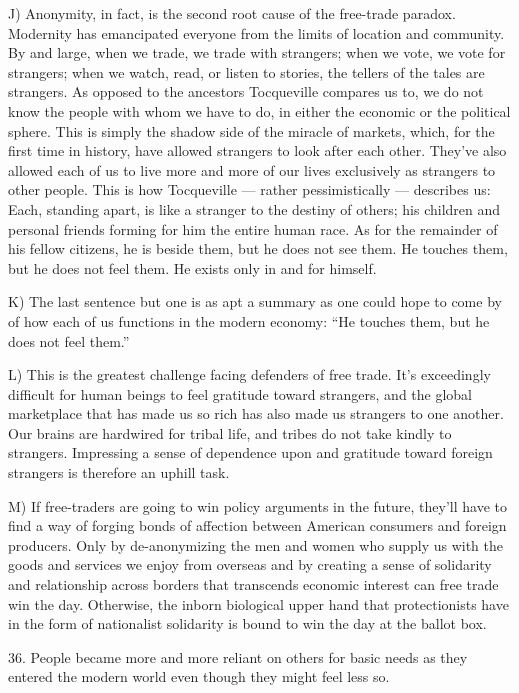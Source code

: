 \documentclass[UTF8,11pt]{ctexart}
\begin{document}
J) Anonymity, in fact, is the second root cause of the free-trade paradox. Modernity has emancipated everyone from the limits of location and community. By and large, when we trade, we trade with strangers; when we vote, we vote for strangers; when we watch, read, or listen to stories, the tellers of the tales are strangers. As opposed to the ancestors Tocqueville compares us to, we do not know the people with whom we have to do, in either the economic or the political sphere. This is simply the shadow side of the miracle of markets, which, for the first time in history, have allowed strangers to look after each other. They’ve also allowed each of us to live more and more of our lives exclusively as strangers to other people. This is how Tocqueville — rather pessimistically — describes us: Each, standing apart, is like a stranger to the destiny of others; his children and personal friends forming for him the entire human race. As for the remainder of his fellow citizens, he is beside them, but he does not see them. He touches them, but he does not feel them. He exists only in and for himself.


K) The last sentence but one is as apt a summary as one could hope to come by of how each of us functions in the modern economy: “He touches them, but he does not feel them.”


L) This is the greatest challenge facing defenders of free trade. It’s exceedingly difficult for human beings to feel gratitude toward strangers, and the global marketplace that has made us so rich has also made us strangers to one another. Our brains are hardwired for tribal life, and tribes do not take kindly to strangers. Impressing a sense of dependence upon and gratitude toward foreign strangers is therefore an uphill task.


M) If free-traders are going to win policy arguments in the future, they’ll have to find a way of forging bonds of affection between American consumers and foreign producers. Only by de-anonymizing the men and women who supply us with the goods and services we enjoy from overseas and by creating a sense of solidarity and relationship across borders that transcends economic interest can free trade win the day. Otherwise, the inborn biological upper hand that protectionists have in the form of nationalist solidarity is bound to win the day at the ballot box.


36. People became more and more reliant on others for basic needs as they entered the modern world even though they might feel less so.
\end{document}
